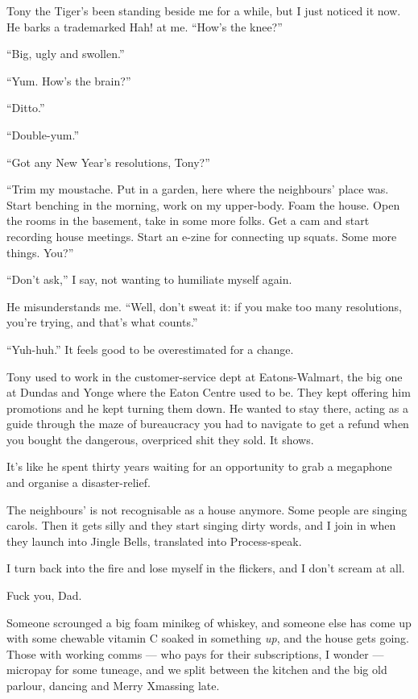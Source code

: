 Tony the Tiger's been standing beside me for a while, but I just
noticed it now. He barks a trademarked Hah! at me.
``How's the knee?''

``Big, ugly and swollen.''

``Yum. How's the brain?''

``Ditto.''

``Double-yum.''

``Got any New Year's resolutions, Tony?''

``Trim my moustache. Put in a garden, here where the neighbours' place was. 
Start benching in the morning, work on my upper-body. Foam the house. Open the 
rooms in the basement, take in some more folks. Get a cam and start recording 
house meetings. Start an e-zine for connecting up squats. Some more things. 
You?''

``Don't ask,'' I say, not wanting to humiliate myself again.

He misunderstands me.
``Well, don't sweat it: if you make too many resolutions, you're trying, and 
that's what counts.''

``Yuh-huh.'' It feels good to be overestimated for a change.

Tony used to work in the customer-service dept at Eatons-Walmart,
the big one at Dundas and Yonge where the Eaton Centre used to be.
They kept offering him promotions and he kept turning them down. He
wanted to stay there, acting as a guide through the maze of
bureaucracy you had to navigate to get a refund when you bought the
dangerous, overpriced shit they sold. It shows.

It's like he spent thirty years waiting for an opportunity to grab
a megaphone and organise a disaster-relief.

The neighbours' is not recognisable as a house anymore. Some people
are singing carols. Then it gets silly and they start singing dirty
words, and I join in when they launch into Jingle Bells, translated
into Process-speak.

I turn back into the fire and lose myself in the flickers, and I
don't scream at all.

Fuck you, Dad.

\tb

Someone scrounged a big foam minikeg of whiskey, and someone else
has come up with some chewable vitamin C soaked in something
\emph{up}, and the house gets going. Those with working comms ---
who pays for their subscriptions, I wonder --- micropay for some
tuneage, and we split between the kitchen and the big old parlour,
dancing and Merry Xmassing late.

